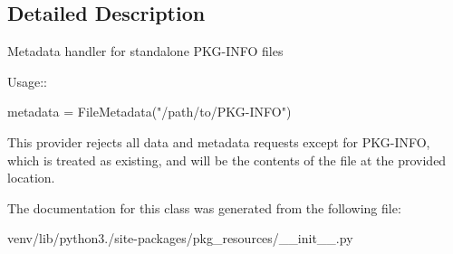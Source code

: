 \subsection{Detailed Description}
\begin{DoxyVerb}Metadata handler for standalone PKG-INFO files

Usage::

    metadata = FileMetadata("/path/to/PKG-INFO")

This provider rejects all data and metadata requests except for PKG-INFO,
which is treated as existing, and will be the contents of the file at
the provided location.
\end{DoxyVerb}
 

The documentation for this class was generated from the following file\+:\begin{DoxyCompactItemize}
\item 
venv/lib/python3./site-\/packages/pkg\+\_\+resources/\+\_\+\+\_\+init\+\_\+\+\_\+.\+py\end{DoxyCompactItemize}
